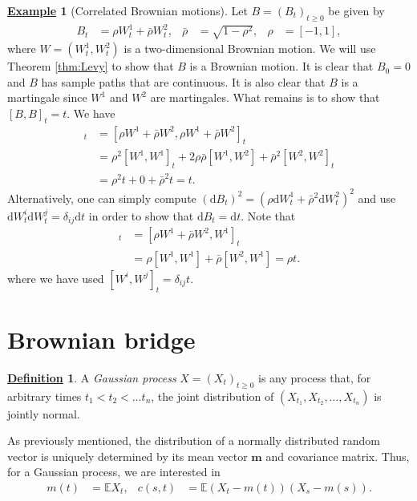 \documentclass[12pt]{book}
\numberwithin{equation}{chapter}
\theoremstyle{plain}
\numberwithin{theorem}{section}
\theoremstyle{definition}
\newtheorem{definition}[theorem]{\underline{Definition}}
\newtheorem{example}[theorem]{\underline{Example}}
\numberwithin{exercise}{chapter}
\newcommand{\<}{\langle}
\renewcommand{\>}{\rangle}
\renewcommand{\(}{\left(}
\renewcommand{\)}{\right)}
\renewcommand{\[}{\left[}
\renewcommand{\]}{\right]}
\newcommand\Eb{\mathds{E}}
\newcommand\del{\delta}
\newcommand\rhob{\bar{\rho}}
\newcommand\mv{\pmb{m}}
\newcommand\dd{\mathrm{d}}
\begin{document}
\begin{example}[Correlated Brownian motions]
Let $B=(B_t)_{t \geq 0}$ be given by
\begin{align}
B_t
	&=	\rho W_t^1 + \rhob W_t^2 , &
\rhob
	&=	\sqrt{ 1 - \rho^2} , &
\rho
	&=	[-1,1] ,
\end{align}
where $W = (W_t^1,W_t^2)$ is a two-dimensional Brownian motion.  We will use Theorem \ref{thm:Levy} to show that $B$ is a Brownian motion.  It is clear that $B_0 = 0$ and $B$ has sample paths that are continuous.  It is also clear that $B$ is a martingale since $W^1$ and $W^2$ are martingales.  What remains is to show that $[B,B]_t = t$.  We have
\begin{align}
[B,B]_t
	&=	[ \rho W^1 + \rhob W^2 , \rho W^1 + \rhob W^2]_t \\
	&=	\rho^2 [W^1,W^1]_t + 2 \rho \rhob [W^1,W^2] + \rhob^2 [W^2,W^2]_t \\
	&=	\rho^2 t + 0 + \rhob^2 t = t .
\end{align}
Alternatively, one can simply compute $(\dd B_t)^2 = ( \rho \dd W_t^1 + \rhob^2 \dd W_t^2)^2$ and use $\dd W_t^i \dd W_t^j = \del_{ij} \dd t$ in order to show that $\dd B_t = \dd t$.  Note that
\begin{align}
[B,W^1]_t
	&=	[\rho W^1 + \rhob W^2,W^1]_t \\
	&=	\rho [W^1,W^1] + \rhob [W^2,W^1] = \rho t .
\end{align}
where we have used $[W^i,W^j]_t=\del_{ij}t$.
\end{example}


\section{Brownian bridge}
\label{sec:bridge}

\begin{definition}
A \emph{Gaussian process} $X = (X_t)_{t \geq 0}$ is any process that, for arbitrary times $t_1 < t_2 < \ldots t_n$, the joint distribution of $(X_{t_1},X_{t_2},\ldots,X_{t_n})$ is jointly normal.
\end{definition}

\noindent
As previously mentioned, the distribution of a normally distributed random vector is uniquely determined by its mean vector $\mv$ and covariance matrix.  Thus, for a Gaussian process, we are interested in
\begin{align}
m(t)
	&=	\Eb X_t , &
c(s,t)
	&=	\Eb \(X_t - m(t) \) \(X_s - m(s) \) .
\end{align}
\end{document}
